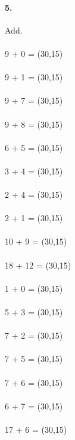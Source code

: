 \documentclass[12pt]{article}
\begin{document}
\paragraph{5.}
Add.
\\
\\
9 + 0 = \framebox(30,15){}
\\
\\
9 + 1 = \framebox(30,15){}
\\
\\
9 + 7 = \framebox(30,15){}
\\
\\
9 + 8 = \framebox(30,15){}
\\
\\
6 + 5 = \framebox(30,15){}
\\
\\
3 + 4 = \framebox(30,15){}
\\
\\
2 + 4 = \framebox(30,15){}
\\
\\
2 + 1 = \framebox(30,15){}
\\
\\
10 + 9 = \framebox(30,15){}
\\
\\
18 + 12 = \framebox(30,15){}
\\
\\
1 + 0 = \framebox(30,15){}
\\
\\
5 + 3 = \framebox(30,15){}
\\
\\
7 + 2 = \framebox(30,15){}
\\
\\
7 + 5 = \framebox(30,15){}
\\
\\
7 + 6 = \framebox(30,15){}
\\
\\
6 + 7 = \framebox(30,15){}
\\
\\
17 + 6 = \framebox(30,15){}

\newpage
\end{document}
